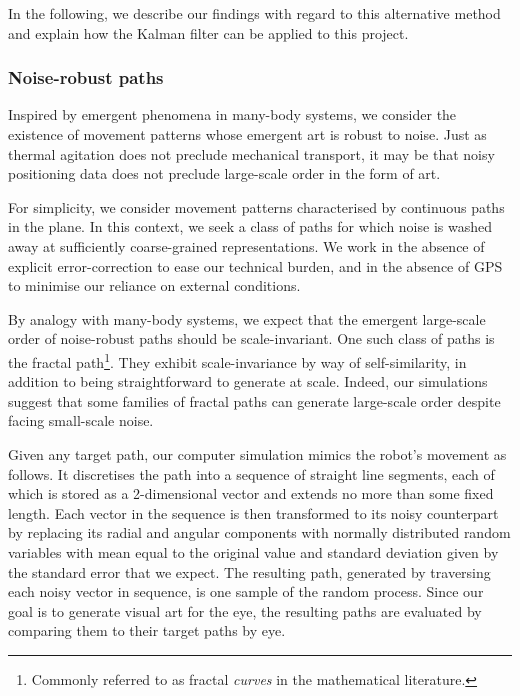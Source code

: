         In the following, we describe our findings with regard to this alternative method and explain how the Kalman filter can be applied to this project.

        \subsubsection{Noise-robust paths}
        Inspired by emergent phenomena in many-body systems, we consider the existence of movement patterns whose emergent art is robust to noise.
        Just as thermal agitation does not preclude mechanical transport, it may be that noisy positioning data does not preclude large-scale order in the form of art.

        For simplicity, we consider movement patterns characterised by continuous paths in the plane.
        In this context, we seek a class of paths for which noise is washed away at sufficiently coarse-grained representations.
        We work in the absence of explicit error-correction to ease our technical burden, and in the absence of GPS to minimise our reliance on external conditions.

        By analogy with many-body systems, we expect that the emergent large-scale order of noise-robust paths should be scale-invariant.
        One such class of paths is the fractal path\footnote{Commonly referred to as fractal \emph{curves} in the mathematical literature.}.
        They exhibit scale-invariance by way of self-similarity, in addition to being straightforward to generate at scale.
        Indeed, our simulations suggest that some families of fractal paths can generate large-scale order despite facing small-scale noise.

        Given any target path, our computer simulation mimics the robot's movement as follows.
        It discretises the path into a sequence of straight line segments, each of which is stored as a 2-dimensional vector and extends no more than some fixed length.
        Each vector in the sequence is then transformed to its noisy counterpart by replacing its radial and angular components with normally distributed random variables with mean equal to the original value and standard deviation given by the standard error that we expect.
        The resulting path, generated by traversing each noisy vector in sequence, is one sample of the random process.
        Since our goal is to generate visual art for the eye, the resulting paths are evaluated by comparing them to their target paths by eye.

